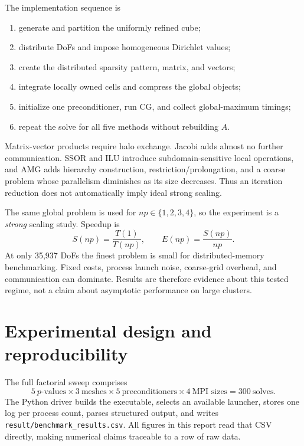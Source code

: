 \documentclass[10pt,a4paper]{article}
\begin{document}
The implementation sequence is
\begin{enumerate}
 \item generate and partition the uniformly refined cube;
 \item distribute DoFs and impose homogeneous Dirichlet values;
 \item create the distributed sparsity pattern, matrix, and vectors;
 \item integrate locally owned cells and compress the global objects;
 \item initialize one preconditioner, run CG, and collect global-maximum timings;
 \item repeat the solve for all five methods without rebuilding $A$.
\end{enumerate}

Matrix-vector products require halo exchange. Jacobi adds almost no further communication. SSOR
and ILU introduce subdomain-sensitive local operations, and AMG adds hierarchy construction,
restriction/prolongation, and a coarse problem whose parallelism diminishes as its size decreases.
Thus an iteration reduction does not automatically imply ideal strong scaling.

The same global problem is used for $np\in\{1,2,3,4\}$, so the experiment is a \emph{strong}
scaling study. Speedup is
\begin{equation}
 S(np)=\frac{T(1)}{T(np)},\qquad E(np)=\frac{S(np)}{np}.
\end{equation}
At only 35,937 DoFs the finest problem is small for distributed-memory benchmarking. Fixed costs,
process launch noise, coarse-grid overhead, and communication can dominate. Results are therefore
evidence about this tested regime, not a claim about asymptotic performance on large clusters.

\newpage
\section{Experimental design and reproducibility}
The full factorial sweep comprises
\[
 5\ p\text{-values}\times3\ \text{meshes}\times5\ \text{preconditioners}
 \times4\ \text{MPI sizes}=300\ \text{solves}.
\]
The Python driver builds the executable, selects an available launcher, stores one log per process
count, parses structured output, and writes \texttt{result/benchmark\_results.csv}. All figures in
this report read that CSV directly, making numerical claims traceable to a row of raw data.
\end{document}
